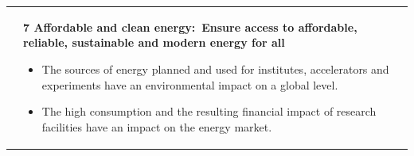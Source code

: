 \documentclass[../SustainableHEP.tex]{subfiles}
\begin{document}
\begin{longtable*}{l l}
\parbox[t]{\SDGleft\textwidth}{} & \parbox[t]{\SDGright\textwidth}{\textbf{7 Affordable and clean energy:\ Ensure access to affordable, reliable, sustainable and modern energy for all}
\vspace{\recskip}
\begin{itemize}[leftmargin=20pt]
\setlength{\itemsep}{\recskip}
\item The sources of energy planned and used for institutes, accelerators and experiments have an environmental impact on a global level.
\item The high consumption and the resulting financial impact of research facilities have an impact on the energy market.
\end{itemize}}\\


\end{longtable*}
\end{document}

